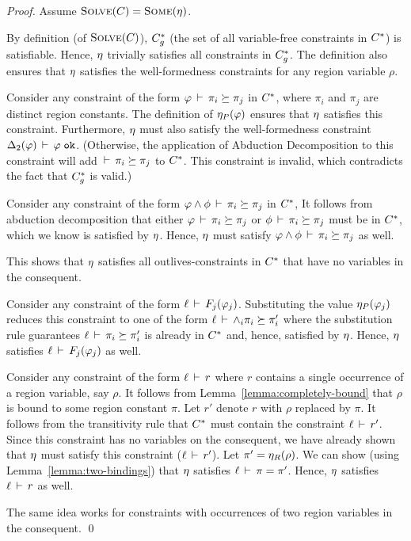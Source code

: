 \begin{proof}
Assume $\textsc{Solve}(C) = \textsc{Some}(\eta)$.

By definition (of $\textsc{Solve}(C)$), ${C}^*_g$ (the set of all variable-free constraints in ${C}^*$)
is satisfiable. Hence, $\eta$ trivially satisfies all constraints in ${C}^*_g$.
%
The definition also ensures that $\eta$ satisfies the well-formedness constraints
for any region variable $\rho$.

Consider any constraint of the form $\varphi\,\vdash\,\pi_i \succeq \pi_j$ in ${C}^*$,
where $\pi_i$ and $\pi_j$ are distinct region constants. The definition of $\eta_P(\varphi)$
ensures that $\eta$ satisfies this constraint.
Furthermore, $\eta$ must also satisfy the well-formedness constraint
${\Delta_2}(\varphi)\,\vdash\,\varphi \; \texttt{ok}$.
(Otherwise, the application of Abduction Decomposition to this constraint will add
$\,\vdash\,\pi_i \succeq \pi_j$ to ${C}^*$. This constraint is invalid, which
contradicts the fact that ${C}^*_g$ is valid.)

Consider any constraint of the form $\varphi \wedge \phi\,\vdash\,\pi_i \succeq \pi_j$ in ${C}^*$,
It follows from abduction decomposition that either
$\varphi\,\vdash\,\pi_i \succeq \pi_j$
or
$\phi\,\vdash\,\pi_i \succeq \pi_j$ must be in ${C}^*$, which we know is satisfied by $\eta$.
Hence, $\eta$ must satisfy
$\varphi \wedge \phi\,\vdash\,\pi_i \succeq \pi_j$ as well.

This shows that $\eta$ satisfies all outlives-constraints in ${C}^*$ that have no variables in the consequent.

Consider any constraint of the form $\ell\,\vdash\,F_j(\varphi_j)$.
Substituting the value $\eta_P(\varphi_j)$ reduces this constraint to one of
the form $\ell\,\vdash\,\wedge_i \pi_i \succeq \pi_i'$ where the substitution rule
guarantees $\ell\,\vdash\,\pi_i \succeq \pi_i'$ is already in ${C}^*$ and, hence,
satisfied by $\eta$.
Hence, $\eta$ satisfies $\ell\,\vdash\,F_j(\varphi_j)$ as well.

Consider any constraint of the form $\ell\,\vdash\,r$ where $r$ contains a single occurrence
of a region variable, say $\rho$.
It follows from Lemma~\ref{lemma:completely-bound} that $\rho$ is bound to some region
constant $\pi$.
Let $r'$ denote $r$ with $\rho$ replaced by $\pi$.
It follows from the transitivity rule that ${C}^*$ must contain the constraint $\ell\,\vdash\,r'$.
Since this constraint has no variables on the consequent, we have already shown that $\eta$
must satisfy this constraint ($\ell\,\vdash\,r'$).
Let $\pi' = \eta_R(\rho)$.
We can show (using Lemma~\ref{lemma:two-bindings}) that $\eta$ satisfies $\ell\,\vdash\,\pi = \pi'$.
Hence, $\eta$ satisfies $\ell\,\vdash\,r$ as well.

The same idea works for constraints with occurrences of two region variables in the consequent.
\qed
\end{proof}

